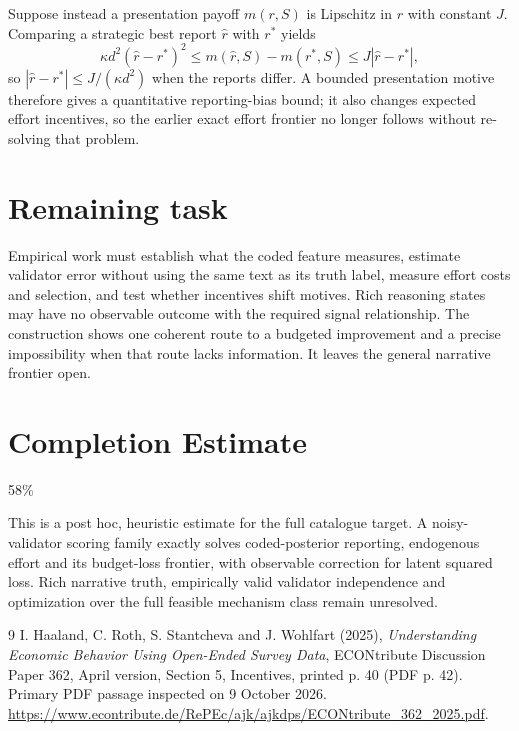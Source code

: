 \documentclass[11pt]{article}
\begin{document}
Suppose instead a presentation payoff $m(r,S)$ is Lipschitz in $r$ with constant $J$. Comparing a strategic best report $\widehat r$ with $r^*$ yields
\[
 \kappa d^2(\widehat r-r^*)^2
 \leq m(\widehat r,S)-m(r^*,S)
 \leq J|\widehat r-r^*|,
\]
so $|\widehat r-r^*|\leq J/(\kappa d^2)$ when the reports differ. A bounded presentation motive therefore gives a quantitative reporting-bias bound; it also changes expected effort incentives, so the earlier exact effort frontier no longer follows without re-solving that problem.

\section*{Remaining task}
Empirical work must establish what the coded feature measures, estimate validator error without using the same text as its truth label, measure effort costs and selection, and test whether incentives shift motives. Rich reasoning states may have no observable outcome with the required signal relationship. The construction shows one coherent route to a budgeted improvement and a precise impossibility when that route lacks information. It leaves the general narrative frontier open.

\section{Completion Estimate}
58\%

This is a post hoc, heuristic estimate for the full catalogue target.
A noisy-validator scoring family exactly solves coded-posterior reporting, endogenous effort and its budget-loss frontier, with observable correction for latent squared loss. Rich narrative truth, empirically valid validator independence and optimization over the full feasible mechanism class remain unresolved.

\begin{thebibliography}{9}
 I. Haaland, C. Roth, S. Stantcheva and J. Wohlfart (2025), \emph{Understanding Economic Behavior Using Open-Ended Survey Data}, ECONtribute Discussion Paper 362, April version, Section 5, Incentives, printed p. 40 (PDF p. 42). Primary PDF passage inspected on 9 October 2026. \url{https://www.econtribute.de/RePEc/ajk/ajkdps/ECONtribute_362_2025.pdf}.
\end{thebibliography}
\end{document}

